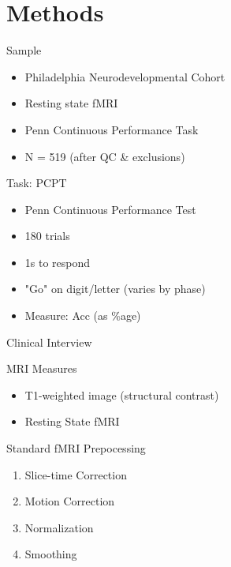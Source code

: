 \documentclass[presentation]{beamer}
\begin{document}
\section{Methods}
\label{sec:orgheadline18}
\begin{frame}[label={sec:orgheadline4}]{Sample}
\begin{itemize}
\item Philadelphia Neurodevelopmental Cohort
\item Resting state fMRI
\item Penn Continuous Performance Task
\item N = 519 (after QC \& exclusions)
\end{itemize}
\end{frame}
\begin{frame}[label={sec:orgheadline5}]{Task: PCPT}
\begin{itemize}
\item Penn Continuous Performance Test
\item 180 trials
\item 1s to respond
\item "Go" on digit/letter (varies by phase)
\item Measure: Acc (as \%age)
\end{itemize}
\end{frame}
\begin{frame}[label={sec:orgheadline6}]{Clinical Interview}
\end{frame}
\begin{frame}[label={sec:orgheadline7}]{MRI Measures}
\begin{itemize}
\item T1-weighted image (structural contrast)
\item Resting State fMRI
\end{itemize}
\end{frame}
\begin{frame}[label={sec:orgheadline8}]{Standard fMRI Prepocessing}
\begin{enumerate}
\item Slice-time Correction
\item Motion Correction
\item Normalization
\item Smoothing
\end{enumerate}
\end{frame}
\end{document}

